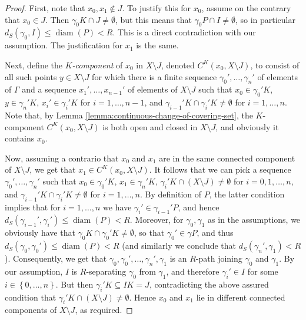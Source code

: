 \documentclass[12pt, a4paper]{article}
\newcommand{\8}{\infty}
\newcommand{\set}[1]{\left\{ #1 \right\}}
\DeclareMathOperator{\diam}{diam}
\theoremstyle{break}
\theoremstyle{defbreak}
\begin{document}
\begin{proof}
    First, note that $x_0,x_1\not\in J$. 
To justify this for $x_0$,
assume on the contrary that $x_0\in J$. Then $\gamma_0 K \cap J \neq \emptyset$, but this means that $\gamma_0P \cap I\neq \emptyset$, so in particular $d_S(\gamma_0, I) \leqslant \diam(P) < R$. This is a direct contradiction with our assumption. The justification for $x_1$ is the same.

    Next, define the {\it $K$-component} of $x_0$ in $X\setminus J$,
denoted $C^K(x_0,X\setminus J)$, 
to consist of all such points $y\in X\setminus J$ for which there is a 
finite sequence
$\gamma_0',\dots,\gamma_n'$ of elements of $\Gamma$
and a sequence $x_1',\dots,x_{n-1}'$ of elements of $X\setminus J$ 
such that $x_0\in\gamma_0'K$,
$y\in\gamma_n'K$, $x_i'\in\gamma_i'K$ for $i=1,\dots,n-1$, 
and
$\gamma_{i-1}'K\cap\gamma_i'K\ne\emptyset$ for $i=1,\dots,n$. 
Note that, by Lemma \ref{lemma:continuous-change-of-covering-set},
the $K$-component $C^K(x_0,X\setminus J)$ is both open and closed in 
$X\setminus J$,
and obviously it contains $x_0$. 

Now, assuming a contrario that $x_0$ and $x_1$ are in the same 
connected component of $X\setminus J$, we get that 
$x_1\in C^K(x_0,X\setminus J)$.
It follows that we can pick a sequence
$\gamma_0',\dots,\gamma_n'$  such that
$x_0\in\gamma_0'K$, $x_1\in\gamma_n'K$, 
$\gamma_i'K\cap(X\setminus J)\ne\emptyset$ for $i=0,1,\dots,n$, and
$\gamma_{i-1}'K\cap\gamma_i'K\ne\emptyset$ for $i=1,\dots,n$. 
By definition of $P$, the latter condition implies that
for $i=1,\dots,n$ we have
$\gamma_i'\in\gamma_{i-1}'P$, and hence 
$d_S(\gamma_{i-1}',\gamma_i')\leqslant\diam(P)<R$.
Moreover, for $\gamma_0,\gamma_1$ as in the assumptions,
we obviously have that $\gamma_0K\cap\gamma_0'K\ne\emptyset$,
so that $\gamma_0'\in\gamma P$, and thus 
$d_S(\gamma_0,\gamma_0')\leqslant\diam(P)<R$
(and similarly we conclude that $d_S(\gamma_n',\gamma_1)<R$). 
Consequently, we get that 
$\gamma_0,\gamma_0',\dots,\gamma_n',\gamma_1$
is an $R$-path joining $\gamma_0$ and $\gamma_1$. By our assumption, $I$ is $R$-separating $\gamma_0$ from $\gamma_1$, 
and therefore $\gamma_i'\in I$ 
for some $i\in \set{0, \ldots, n}$. 
But then $\gamma_i'K \subseteq IK = J$,
contradicting the above assured condition that 
$\gamma_i'K\cap(X\setminus J)\ne\emptyset$. Hence $x_0$ and $x_1$ lie in different connected components of $X\setminus J$, as required.
\end{proof}
\end{document}
